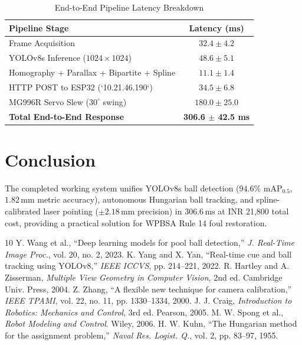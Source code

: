 \documentclass[conference]{IEEEtran}
\begin{document}
\begin{table}[htbp]
\centering
\caption{End-to-End Pipeline Latency Breakdown}
\label{tab:lat}
\scriptsize
\begin{tabular}{|l|c|}
\hline
\textbf{Pipeline Stage} & \textbf{Latency (ms)} \\
\hline
Frame Acquisition & $32.4 \pm 4.2$ \\
YOLOv8s Inference ($1024 \times 1024$) & $48.6 \pm 5.1$ \\
Homography + Parallax + Bipartite + Spline & $11.1 \pm 1.4$ \\
HTTP POST to ESP32 (`10.21.46.190`) & $34.5 \pm 6.8$ \\
MG996R Servo Slew ($30^\circ$ swing) & $180.0 \pm 25.0$ \\
\hline
\textbf{Total End-to-End Response} & \textbf{306.6 $\pm$ 42.5 ms} \\
\hline
\end{tabular}
\end{table}

\section{Conclusion}
The completed working system unifies YOLOv8s ball detection ($94.6\%$ $\text{mAP}_{0.5}$, $1.82\,\text{mm}$ metric accuracy), autonomous Hungarian ball tracking, and spline-calibrated laser pointing ($\pm 2.18\,\text{mm}$ precision) in $306.6\,\text{ms}$ at INR 21,800 total cost, providing a practical solution for WPBSA Rule 14 foul restoration.


\begin{thebibliography}{10}
 Y. Wang et al., ``Deep learning models for pool ball detection,'' \textit{J. Real-Time Image Proc.}, vol. 20, no. 2, 2023.
 K. Yang and X. Yan, ``Real-time cue and ball tracking using YOLOv8,'' \textit{IEEE ICCVS}, pp. 214--221, 2022.
 R. Hartley and A. Zisserman, \textit{Multiple View Geometry in Computer Vision}, 2nd ed. Cambridge Univ. Press, 2004.
 Z. Zhang, ``A flexible new technique for camera calibration,'' \textit{IEEE TPAMI}, vol. 22, no. 11, pp. 1330--1334, 2000.
 J. J. Craig, \textit{Introduction to Robotics: Mechanics and Control}, 3rd ed. Pearson, 2005.
 M. W. Spong et al., \textit{Robot Modeling and Control}. Wiley, 2006.
 H. W. Kuhn, ``The Hungarian method for the assignment problem,'' \textit{Naval Res. Logist. Q.}, vol. 2, pp. 83--97, 1955.
\end{thebibliography}
\end{document}
